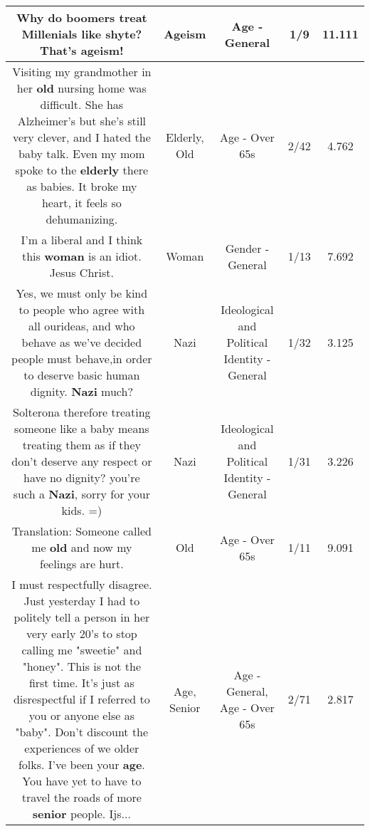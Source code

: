 \documentclass[11pt]{article}
\newlength\mylength
\begin{document}
\begin{center}
\begin{longtable}{|C{.65\mylength}|C{.30\mylength}|C{.12\mylength}|C{.12\mylength}|C{.12\mylength}|}
  \small Why do boomers treat Millenials like shyte? That's \textbf{ageism}!\normalsize   & Ageism & Age - General & 1/9 & 11.111 \\  \hline
  \small Visiting my grandmother in her \textbf{old} nursing home was difficult. She has Alzheimer's but she's still very clever, and I hated the baby talk. Even my mom spoke to the \textbf{elderly} there as babies. It broke my heart, it feels so dehumanizing.\normalsize   & Elderly, Old & Age - Over 65s & 2/42 & 4.762 \\  \hline
  \small I'm a liberal and I think this \textbf{woman} is an idiot. Jesus Christ.\normalsize   & Woman & Gender - General & 1/13 & 7.692 \\  \hline
  \small Yes, we must only be kind to people who agree with all ourideas, and who behave as we've decided people must behave,in order to deserve basic human dignity.  \textbf{Nazi} much?\normalsize   & Nazi &  Ideological and Political Identity - General & 1/32 & 3.125 \\  \hline
  \small {} Solterona therefore treating someone like a baby means treating them as if they don't deserve any respect or have no dignity? you're such a \textbf{Nazi}, sorry for your kids. =)\normalsize   & Nazi &  Ideological and Political Identity - General & 1/31 & 3.226 \\  \hline
  \small Translation: Someone called me \textbf{old} and now my feelings are hurt.\normalsize   & Old & Age - Over 65s & 1/11 & 9.091 \\  \hline
  \small I must respectfully disagree. Just yesterday I had to politely tell a person in her very early 20's to stop calling me "sweetie" and "honey". This is not the first time. It's just as disrespectful if I referred to you or anyone else as "baby". Don't discount the experiences of we older folks. I've been your \textbf{age}. You have yet to have to travel the roads of more \textbf{senior} people. Ijs...\normalsize   & Age, Senior & Age - General, Age - Over 65s & 2/71 & 2.817 \\  \hline

\end{longtable}
\end{center}
\end{document}
